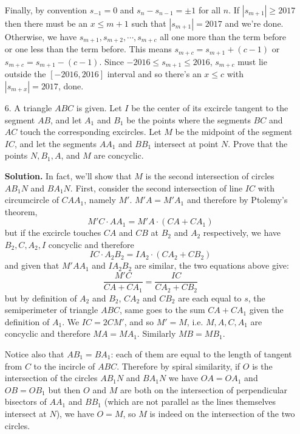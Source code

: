 \documentclass[11pt,a4paper]{article}
\begin{document}
\begin{enumerate}
	Finally, by convention $s_{-1}=0$ and $s_n-s_{n-1}=\pm 1$ for all $n$. If $|s_{m+1}|\ge 2017$ then there must be an $x\le m+1$ such that $|s_{m+1}|=2017$ and we're done. Otherwise, we have $s_{m+1}, s_{m+2}, \cdots , s_{m+c}$ all one more than the term before or one less than the term before. This means $s_{m+c}=s_{m+1}+(c-1)$ or $s_{m+c}=s_{m+1}-(c-1)$. Since $-2016\le s_{m+1}\le 2016$, $s_{m+c}$ must lie outside the $[-2016, 2016]$ interval and so there's an $x\le c$ with $|s_{m+x}|=2017$, done. 
	
	\item[6.] A triangle $ABC$ is given. Let $I$ be the center of its excircle tangent to the segment $AB$, and let $A_1$ and $B_1$ be the points where the segments $BC$ and $AC$ touch the corresponding excircles. Let $M$ be the midpoint of the segment $IC$, and let the segments $AA_1$ and $BB_1$ intersect at point $N$. Prove that the points $N, B_1, A$, and $M$ are concyclic.
	
	\textbf{Solution.} In fact, we'll show that $M$ is the second intersection of circles $AB_1N$ and $BA_1N$. First, consider the second intersection of line $IC$ with circumcircle of $CAA_1$, namely $M'$. $M'A=M'A_1$ and therefore by Ptolemy's theorem,
	\[
	M'C\cdot AA_1 = M'A \cdot (CA+CA_1) 
	\]
	but if the excircle touches $CA$ and $CB$ at $B_2$ and $A_2$ respectively, we have $B_2, C, A_2, I$ concyclic and therefore 
	\[
	IC\cdot A_2B_2 = IA_2 \cdot (CA_2+CB_2) 
	\]
	and given that $M'AA_1$ and $IA_2B_2$ are similar, the two equations above give: 
	\[
	\frac{M'C}{CA+CA_1}=\frac{IC}{CA_2+CB_2}
	\]
	but by definition of $A_2$ and $B_2$, $CA_2$ and $CB_2$ are each equal to $s$, the semiperimeter of triangle $ABC$, same goes to the sum $CA+CA_1$ given the definition of $A_1$. We $IC=2CM'$, and so $M'=M$, i.e. $M, A, C, A_1$ are concyclic and therefore $MA=MA_1$. Similarly $MB=MB_1$. 
	
	Notice also that $AB_1=BA_1$: each of them are equal to the length of tangent from $C$ to the incircle of $ABC$. Therefore by spiral similarity, if $O$ is the intersection of the circles $AB_1N$ and $BA_1N$ we have $OA=OA_1$ and $OB=OB_1$ but then $O$ and $M$ are both on the intersection of perpendicular bisectors of $AA_1$ and $BB_1$ (which are not parallel as the lines themselves intersect at $N$), we have $O=M$, so $M$ is indeed on the intersection of the two circles. 
\end{enumerate}
\end{document}
